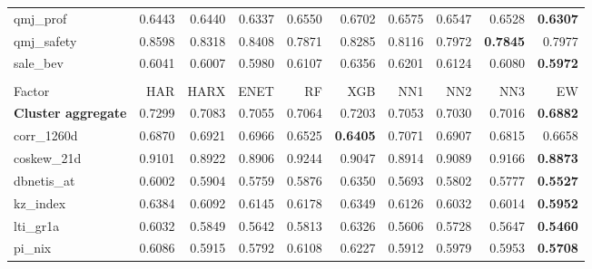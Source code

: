 \begin{longtable}{>{\raggedright\arraybackslash}p{2.6cm}rrrrrrrrr}
qmj\_prof & 0.6443 & \cellcolor{blue!10}0.6440 & \cellcolor{blue!10}0.6337 & 0.6550 & 0.6702 & 0.6575 & 0.6547 & 0.6528 & \textbf{\cellcolor{blue!10}0.6307} \\
qmj\_safety & 0.8598 & \cellcolor{blue!10}0.8318 & \cellcolor{blue!10}0.8408 & \cellcolor{blue!10}0.7871 & \cellcolor{blue!10}0.8285 & \cellcolor{blue!10}0.8116 & \cellcolor{blue!10}0.7972 & \textbf{\cellcolor{blue!10}0.7845} & \cellcolor{blue!10}0.7977 \\
sale\_bev & 0.6041 & \cellcolor{blue!10}0.6007 & \cellcolor{blue!10}0.5980 & 0.6107 & 0.6356 & 0.6201 & 0.6124 & 0.6080 & \textbf{\cellcolor{blue!10}0.5972} \\
\hline
\multicolumn{10}{@{}l}{\textit{Panel J. Seasonality}} \\
\hline
Factor & HAR & HARX & ENET & RF & XGB & NN1 & NN2 & NN3 & EW \\
\hline
\textbf{Cluster aggregate} & 0.7299 & \cellcolor{blue!10}0.7083 & \cellcolor{blue!10}0.7055 & \cellcolor{blue!10}0.7064 & \cellcolor{blue!10}0.7203 & \cellcolor{blue!10}0.7053 & \cellcolor{blue!10}0.7030 & \cellcolor{blue!10}0.7016 & \textbf{\cellcolor{blue!10}0.6882} \\
corr\_1260d & 0.6870 & 0.6921 & 0.6966 & \cellcolor{blue!10}0.6525 & \textbf{\cellcolor{blue!10}0.6405} & 0.7071 & 0.6907 & \cellcolor{blue!10}0.6815 & \cellcolor{blue!10}0.6658 \\
coskew\_21d & 0.9101 & \cellcolor{blue!10}0.8922 & \cellcolor{blue!10}0.8906 & 0.9244 & \cellcolor{blue!10}0.9047 & \cellcolor{blue!10}0.8914 & \cellcolor{blue!10}0.9089 & 0.9166 & \textbf{\cellcolor{blue!10}0.8873} \\
dbnetis\_at & 0.6002 & \cellcolor{blue!10}0.5904 & \cellcolor{blue!10}0.5759 & \cellcolor{blue!10}0.5876 & 0.6350 & \cellcolor{blue!10}0.5693 & \cellcolor{blue!10}0.5802 & \cellcolor{blue!10}0.5777 & \textbf{\cellcolor{blue!10}0.5527} \\
kz\_index & 0.6384 & \cellcolor{blue!10}0.6092 & \cellcolor{blue!10}0.6145 & \cellcolor{blue!10}0.6178 & \cellcolor{blue!10}0.6349 & \cellcolor{blue!10}0.6126 & \cellcolor{blue!10}0.6032 & \cellcolor{blue!10}0.6014 & \textbf{\cellcolor{blue!10}0.5952} \\
lti\_gr1a & 0.6032 & \cellcolor{blue!10}0.5849 & \cellcolor{blue!10}0.5642 & \cellcolor{blue!10}0.5813 & 0.6326 & \cellcolor{blue!10}0.5606 & \cellcolor{blue!10}0.5728 & \cellcolor{blue!10}0.5647 & \textbf{\cellcolor{blue!10}0.5460} \\
pi\_nix & 0.6086 & \cellcolor{blue!10}0.5915 & \cellcolor{blue!10}0.5792 & 0.6108 & 0.6227 & \cellcolor{blue!10}0.5912 & \cellcolor{blue!10}0.5979 & \cellcolor{blue!10}0.5953 & \textbf{\cellcolor{blue!10}0.5708} \\

\end{longtable}
